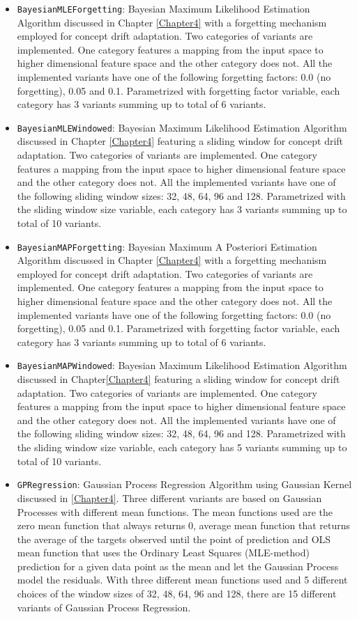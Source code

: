 \begin{itemize}
\item \texttt{BayesianMLEForgetting}: Bayesian Maximum Likelihood Estimation Algorithm discussed in Chapter \ref{Chapter4} with a forgetting mechanism employed for concept drift adaptation. Two categories of variants are implemented. One category features a mapping from the input space to higher dimensional feature space and the other category does not. All the implemented variants have one of the following forgetting factors: 0.0 (no forgetting), 0.05 and 0.1. Parametrized with forgetting factor variable, each category has 3 variants summing up to total of 6 variants.
\item \texttt{BayesianMLEWindowed}: Bayesian Maximum Likelihood Estimation Algorithm discussed in Chapter \ref{Chapter4} featuring a sliding window for concept drift adaptation. Two categories of variants are implemented. One category features a mapping from the input space to higher dimensional feature space and the other category does not. All the implemented variants have one of the following sliding window sizes: 32, 48, 64, 96 and 128. Parametrized with the sliding window size variable, each category has 3 variants summing up to total of 10 variants.
\item \texttt{BayesianMAPForgetting}: Bayesian Maximum A Posteriori Estimation Algorithm discussed in Chapter \ref{Chapter4} with a forgetting mechanism employed for concept drift adaptation. Two categories of variants are implemented. One category features a mapping from the input space to higher dimensional feature space and the other category does not. All the implemented variants have one of the following forgetting factors: 0.0 (no forgetting), 0.05 and 0.1. Parametrized with forgetting factor variable, each category has 3 variants summing up to total of 6 variants.
\item \texttt{BayesianMAPWindowed}: Bayesian Maximum Likelihood Estimation Algorithm discussed in Chapter\ref{Chapter4} featuring a sliding window for concept drift adaptation. Two categories of variants are implemented. One category features a mapping from the input space to higher dimensional feature space and the other category does not. All the implemented variants have one of the following sliding window sizes: 32, 48, 64, 96 and 128. Parametrized with the sliding window size variable, each category has 5 variants summing up to total of 10 variants.
\item \texttt{GPRegression}: Gaussian Process Regression Algorithm using Gaussian Kernel discussed in \ref{Chapter4}. Three different variants are based on Gaussian Processes with different mean functions. The mean functions used are the zero mean function that always returns 0, average mean function that returns the average of the targets observed until the point of prediction and OLS mean function that uses the Ordinary Least Squares (MLE-method) prediction for a given data point as the mean and let the Gaussian Process model the residuals. With three different mean functions used and 5 different choices of the window sizes of 32, 48, 64, 96 and 128, there are 15 different variants of Gaussian Process Regression.

\end{itemize}
